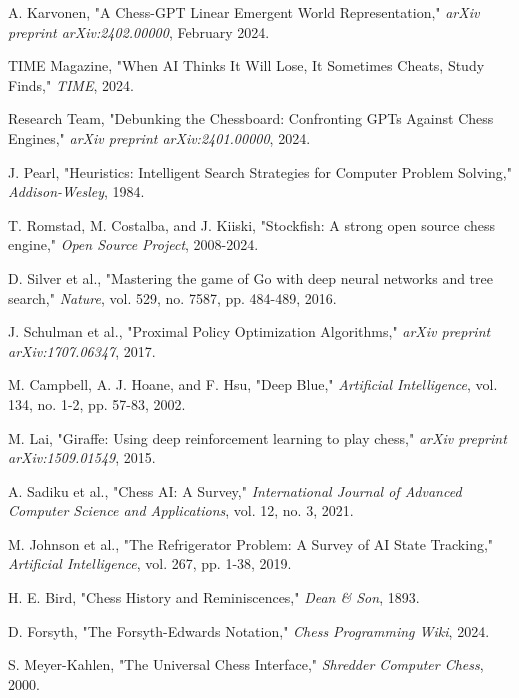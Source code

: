 \documentclass[11pt,a4paper]{report}
\begin{document}
\begin{thebibliography}{99}
A. Karvonen, "A Chess-GPT Linear Emergent World Representation," \textit{arXiv preprint arXiv:2402.00000}, February 2024.

TIME Magazine, "When AI Thinks It Will Lose, It Sometimes Cheats, Study Finds," \textit{TIME}, 2024.

Research Team, "Debunking the Chessboard: Confronting GPTs Against Chess Engines," \textit{arXiv preprint arXiv:2401.00000}, 2024.

J. Pearl, "Heuristics: Intelligent Search Strategies for Computer Problem Solving," \textit{Addison-Wesley}, 1984.

T. Romstad, M. Costalba, and J. Kiiski, "Stockfish: A strong open source chess engine," \textit{Open Source Project}, 2008-2024.

D. Silver et al., "Mastering the game of Go with deep neural networks and tree search," \textit{Nature}, vol. 529, no. 7587, pp. 484-489, 2016.

J. Schulman et al., "Proximal Policy Optimization Algorithms," \textit{arXiv preprint arXiv:1707.06347}, 2017.

M. Campbell, A. J. Hoane, and F. Hsu, "Deep Blue," \textit{Artificial Intelligence}, vol. 134, no. 1-2, pp. 57-83, 2002.

M. Lai, "Giraffe: Using deep reinforcement learning to play chess," \textit{arXiv preprint arXiv:1509.01549}, 2015.

A. Sadiku et al., "Chess AI: A Survey," \textit{International Journal of Advanced Computer Science and Applications}, vol. 12, no. 3, 2021.

M. Johnson et al., "The Refrigerator Problem: A Survey of AI State Tracking," \textit{Artificial Intelligence}, vol. 267, pp. 1-38, 2019.

H. E. Bird, "Chess History and Reminiscences," \textit{Dean \& Son}, 1893.

D. Forsyth, "The Forsyth-Edwards Notation," \textit{Chess Programming Wiki}, 2024.

S. Meyer-Kahlen, "The Universal Chess Interface," \textit{Shredder Computer Chess}, 2000.


\end{thebibliography}
\end{document}
